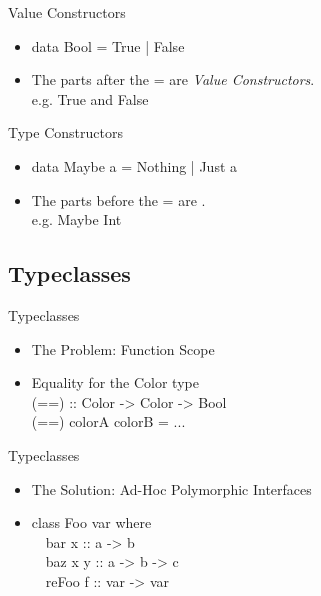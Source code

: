 \documentclass{beamer}                  %
\newcommand{\srule}{
	\rule{\textwidth}{1pt}\\
}
\newlength{\subsecwidth}
\newenvironment{slide}{
	\begin{frame} %
	\settowidth{\subsecwidth}{\insertsubsection} %
	\ifthenelse{\dimtest{\subsecwidth}{<}{1pt}}{ %
		\frametitle{\insertsection\\             %
		\vspace{-1ex}                            %
		\color{fore}\srule                       %
		\par                                     %
		\vspace{-3ex}                            %
		}
	}{                                           %
		\frametitle{\insertsection\ -- \insertsubsection\\ %
		\vspace{-1ex}                            %
		\color{fore}\srule                       %
		\par                                     %
		\vspace{-3ex}                            %
		}
	}
	\Large                                       %
}{
	\end{frame}
}
\begin{document}
\begin{slide}
  Value Constructors
  \begin{itemize}
    \item data Bool = True | False
    \item The parts after the = are \textit{Value Constructors}.\\
      e.g. True and False
  \end{itemize}
\end{slide}

\begin{slide}
  Type Constructors
  \begin{itemize}
    \item data Maybe a = Nothing | Just a
    \item The parts before the = are .\\
      e.g. Maybe Int
  \end{itemize}
\end{slide}

\subsection{Typeclasses}

\begin{slide}
  Typeclasses
  \begin{itemize}
    \item The Problem: Function Scope
    \item Equality for the Color type\\

      (==) :: Color -> Color -> Bool\\
      (==) colorA colorB = ...
  \end{itemize}
\end{slide}

\begin{slide}
  Typeclasses
  \begin{itemize}
    \item The Solution: Ad-Hoc Polymorphic Interfaces
    \item
      class Foo var where\\
      ~~bar x :: a -> b\\
      ~~baz x y :: a -> b -> c\\
      ~~reFoo f :: var -> var
  \end{itemize}
\end{slide}
\end{document}
